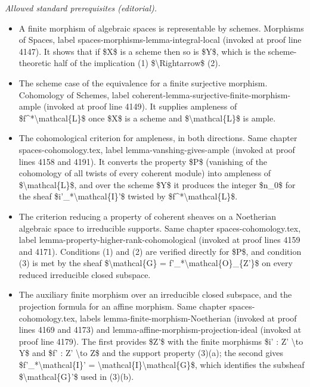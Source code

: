 \documentclass[10pt,a4paper]{amsart}
\theoremstyle{plain}
\theoremstyle{definition}
\theoremstyle{remark}
\numberwithin{equation}{subsection}
\begin{document}
\noindent\textit{Allowed standard prerequisites (editorial).}\begin{itemize}
\item A finite morphism of algebraic spaces is representable by schemes. Morphisms of Spaces, label spaces-morphisms-lemma-integral-local (invoked at proof line 4147). It shows that if \$X\$ is a scheme then so is \$Y\$, which is the scheme-theoretic half of the implication (1) \$\textbackslash{}Rightarrow\$ (2).
\item The scheme case of the equivalence for a finite surjective morphism. Cohomology of Schemes, label coherent-lemma-surjective-finite-morphism-ample (invoked at proof line 4149). It supplies ampleness of \$f\textasciicircum{}*\textbackslash{}mathcal\{L\}\$ once \$X\$ is a scheme and \$\textbackslash{}mathcal\{L\}\$ is ample.
\item The cohomological criterion for ampleness, in both directions. Same chapter spaces-cohomology.tex, label lemma-vanshing-gives-ample (invoked at proof lines 4158 and 4191). It converts the property \$P\$ (vanishing of the cohomology of all twists of every coherent module) into ampleness of \$\textbackslash{}mathcal\{L\}\$, and over the scheme \$Y\$ it produces the integer \$n\_0\$ for the sheaf \$i'\_*\textbackslash{}mathcal\{I\}'\$ twisted by \$f\textasciicircum{}*\textbackslash{}mathcal\{L\}\$.
\item The criterion reducing a property of coherent sheaves on a Noetherian algebraic space to irreducible supports. Same chapter spaces-cohomology.tex, label lemma-property-higher-rank-cohomological (invoked at proof lines 4159 and 4171). Conditions (1) and (2) are verified directly for \$P\$, and condition (3) is met by the sheaf \$\textbackslash{}mathcal\{G\} = f'\_*\textbackslash{}mathcal\{O\}\_\{Z'\}\$ on every reduced irreducible closed subspace.
\item The auxiliary finite morphism over an irreducible closed subspace, and the projection formula for an affine morphism. Same chapter spaces-cohomology.tex, labels lemma-finite-morphism-Noetherian (invoked at proof lines 4169 and 4173) and lemma-affine-morphism-projection-ideal (invoked at proof line 4179). The first provides \$Z'\$ with the finite morphisms \$i' : Z' \textbackslash{}to Y\$ and \$f' : Z' \textbackslash{}to Z\$ and the support property (3)(a); the second gives \$f'\_*\textbackslash{}mathcal\{I\}' = \textbackslash{}mathcal\{I\}\textbackslash{}mathcal\{G\}\$, which identifies the subsheaf \$\textbackslash{}mathcal\{G\}'\$ used in (3)(b).

\end{itemize}
\end{document}

